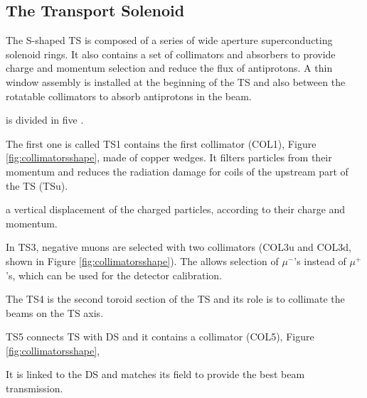 \subsection{The Transport Solenoid}
The S-shaped TS is composed of a series of wide aperture superconducting
solenoid rings. It also contains a set of collimators and absorbers 
to provide charge and 
momentum selection and reduce the flux of antiprotons.
A thin window assembly is installed at the 
beginning of the TS and also between the rotatable collimators 
to absorb antiprotons in 
the beam. 

 is divided in five . 

The first one is called TS1  contains the first collimator (COL1), 
Figure \ref{fig:collimatorsshape}, made of copper wedges. 
It filters particles from their momentum and reduces the 
radiation damage for coils of the 
upstream part of the TS (TSu). 

 a vertical displacement of the charged particles,
according to their charge and momentum.


In TS3, negative muons are selected with two 
collimators (COL3u and COL3d,  shown in Figure \ref{fig:collimatorsshape}). 
The  allows selection
of $\mu^-$'s instead of $\mu^+$'s, which can be used for the detector calibration. 

The TS4 is the second toroid section of the TS and its role is 
to collimate the beams on the TS axis.

TS5 connects TS with DS and it contains a collimator (COL5), 
Figure \ref{fig:collimatorsshape}, 


It is linked to the DS 
and matches its field to provide the best beam transmission.


